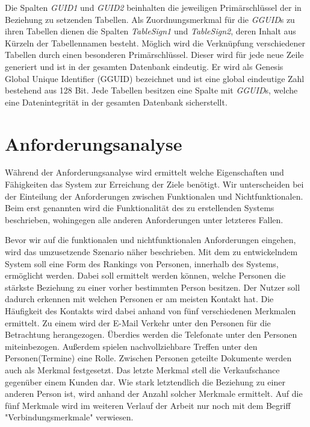 Die Spalten \textit{GUID1} und \textit{GUID2} beinhalten die jeweiligen Primärschlüssel der in Beziehung zu setzenden Tabellen. Als Zuordnungsmerkmal für die \textit{GGUID}s zu ihren Tabellen dienen die Spalten \textit{TableSign1} und \textit{TableSign2}, deren Inhalt aus Kürzeln der Tabellennamen besteht. Möglich wird die Verknüpfung verschiedener Tabellen durch einen besonderen Primärschlüssel. Dieser wird für jede neue Zeile generiert und ist in der gesamten Datenbank eindeutig. Er wird als Genesis Global Unique Identifier (GGUID) bezeichnet und ist eine global eindeutige Zahl bestehend aus 128 Bit. Jede Tabellen besitzen eine Spalte mit \textit{GGUID}s, welche eine Datenintegrität in der gesamten Datenbank sicherstellt.

\section{Anforderungsanalyse}
\label{ch:Systemanalyse:sec:Anforderungsanalyse}

Während der Anforderungsanalyse wird ermittelt welche Eigenschaften und Fähigkeiten das System zur Erreichung der Ziele benötigt. Wir unterscheiden bei der Einteilung der Anforderungen zwischen Funktionalen und Nichtfunktionalen. Beim erst genannten wird die Funktionalität des zu erstellenden Systems beschrieben, wohingegen alle anderen Anforderungen unter letzteres Fallen. 

Bevor wir auf die funktionalen und nichtfunktionalen Anforderungen eingehen, wird das umzusetzende Szenario näher beschrieben. Mit dem zu entwickelndem System soll eine Form des Rankings von Personen, innerhalb des Systems, ermöglicht werden. Dabei soll ermittelt werden können, welche Personen die stärkste Beziehung zu einer vorher bestimmten Person besitzen. Der Nutzer soll dadurch erkennen mit welchen Personen er am meisten Kontakt hat. Die Häufigkeit des Kontakts wird dabei anhand von fünf verschiedenen Merkmalen ermittelt. Zu einem wird der E-Mail Verkehr unter den Personen für die Betrachtung herangezogen. Überdies werden die Telefonate unter den Personen miteinbezogen. Außerdem spielen nachvollziehbare Treffen unter den Personen(Termine) eine Rolle. Zwischen Personen geteilte Dokumente werden auch als Merkmal festgesetzt. Das letzte Merkmal stell die Verkaufschance gegenüber einem Kunden dar. Wie stark letztendlich die Beziehung zu einer anderen Person ist, wird anhand der Anzahl solcher Merkmale ermittelt. Auf die fünf Merkmale wird im weiteren Verlauf der Arbeit nur noch mit dem Begriff "Verbindungsmerkmale" verwiesen.   

